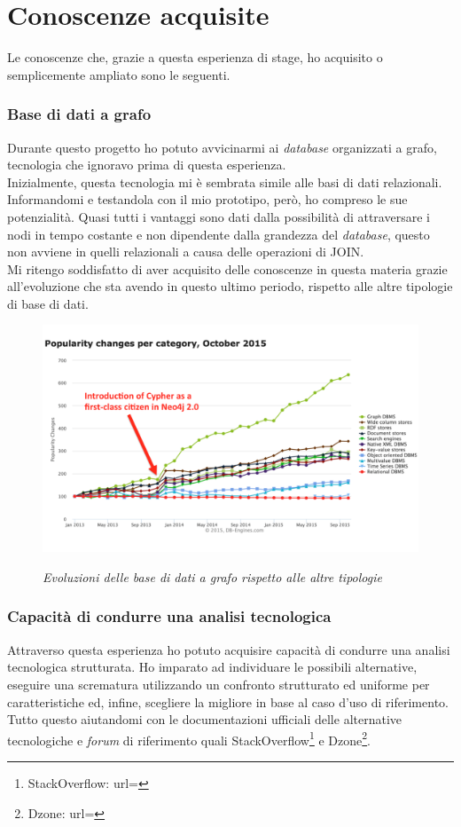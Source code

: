 \section{Conoscenze acquisite}
Le conoscenze che, grazie a questa esperienza di stage, ho acquisito o semplicemente ampliato sono le seguenti.
\subsubsection{Base di dati a grafo}
Durante questo progetto ho potuto avvicinarmi ai \textit{database} organizzati a grafo, tecnologia che ignoravo prima di questa esperienza.\\
Inizialmente, questa tecnologia mi è sembrata simile alle basi di dati relazionali. Informandomi e testandola con il mio prototipo, però, ho compreso le sue potenzialità. Quasi tutti i vantaggi sono dati dalla possibilità di attraversare i nodi in tempo costante e non dipendente dalla grandezza del \textit{database}, questo non avviene in quelli relazionali a causa delle operazioni di \gls{JOIN}.\\
Mi ritengo soddisfatto di aver acquisito delle conoscenze in questa materia grazie all'evoluzione che sta avendo in questo ultimo periodo, rispetto alle altre tipologie di base di dati.
\begin{figure}[h!]
	\centering
	\includegraphics[scale=0.4]{immagini/graphchange.png}
	\label{fig:figura 2.2}
	\caption{\textit{Evoluzioni delle base di dati a grafo rispetto alle altre tipologie }}
\end{figure}
\newpage
\subsubsection{Capacità di condurre una analisi tecnologica}
Attraverso questa esperienza ho potuto acquisire capacità di condurre una analisi tecnologica strutturata. Ho imparato ad individuare le possibili alternative, eseguire una scrematura utilizzando un confronto strutturato ed uniforme per caratteristiche ed, infine, scegliere la migliore in base al caso d'uso di riferimento. Tutto questo aiutandomi con le documentazioni ufficiali delle alternative tecnologiche e \textit{forum} di riferimento quali StackOverflow\footnote{StackOverflow: url= } e Dzone\footnote{Dzone: url= }.
